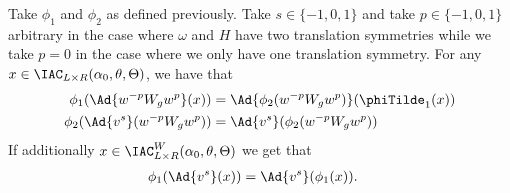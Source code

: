 \begin{lemma}\label{lem:phi1phi2matchingCondition}
	Take $\phi_1$ and $\phi_2$ as defined previously. Take $s\in\{-1,0,1\}$ and take $p\in\{-1,0,1\}$ arbitrary in the case where $\omega$ and $H$ have two translation symmetries while we take $p=0$ in the case where we only have one translation symmetry. For any $x\in\IAC_{L\times R}(\alpha_0,\theta,\Theta)$, we have that
	\begin{align}
		\phi_1(\Ad{w^{-p} W_g w^{p}}(x))&=\Ad{\phi_2(w^{-p} W_g w^{p})}(\phiTilde_1(x))\\
		\phi_2(\Ad{v^s}(w^{-p} W_gw^{p}))&=\Ad{v^s}(\phi_2(w^{-p} W_g w^{p}))
	\end{align}
	If additionally $x\in\IAC_{L\times R}^W(\alpha_0,\theta,\Theta)$ we get that
	\begin{align}
		\phi_1(\Ad{v^{s}}(x))&=\Ad{v^{s}}(\phi_1(x)).
	\end{align}
\end{lemma}
